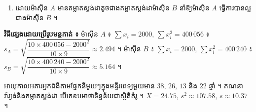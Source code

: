 \begin{example}[លំហាត់គំរូ]
\begin{enumerate}[a]
\[\begin{array}{|c|c|c|}
   & & 56\\ \hline
  \end{array}
  \]
  \[
  \begin{array}{|c|c|c|}\hline
  X_i\,(B) & X_i - \bar{X}_B & (X_i - \bar{X}_B)^2\\ \hline
  192 & -8 & 64\\
  194 & -6 & 36\\
  195 & -5 & 25\\
  198 & -2 & 4\\
  200 & 0 & 0\\
  201 & 1 & 1\\
  203 & 3 & 9\\
  204 & 4 & 16\\
  206 & 6 & 36\\
  207 & 7 & 49\\
  \hline
   & & 240\\ \hline
  \end{array}
  \]
  គម្លាតស្តង់ដាសម្រាប់ម៉ាស៊ីន $A$ ៖ $s_A = \sqrt{\dfrac{\sum(X_i - \bar{X}_A)^2}{n - 1}} = \sqrt{\dfrac{56}{9}} = \sqrt{6.22} \approx 2.49$ ។\\
  គម្លាតស្តង់ដាសម្រាប់ម៉ាស៊ីន $B$ ៖ $s_B = \sqrt{\dfrac{\sum(X_i - \bar{X}_B)^2}{n - 1}} = \sqrt{\dfrac{240}{9}} = \sqrt{26.67} \approx 5.16$ ។
  \item ដោយម៉ាស៊ីន $A$ មានគម្លាតស្តង់ដាតូចជាងគម្លាតស្តង់ដាម៉ាស៊ីន $B$ នាំឱ្យម៉ាស៊ីន $A$ ធ្វើការបានល្អជាងម៉ាស៊ីន $B$ ។
\end{enumerate}
\textbf{វិធីផ្សេងដោយប្រើរូបមន្តកាត់ ៖} ម៉ាស៊ីន $A$ ៖ $\sum x_i = 2000$, $\sum x_i^2 = 400\,056$ ៖ $s_A = \sqrt{\dfrac{10\times 400\,056 - 2000^2}{10\times 9}} \approx 2.494$ ។ ម៉ាស៊ីន $B$ ៖ $\sum x_i = 2000$, $\sum x_i^2 = 400\,240$ ៖ $s_B = \sqrt{\dfrac{10\times 400\,240 - 2000^2}{10\times 9}} \approx 5.164$ ។
\end{example}

\begin{pro}
អាយុកាលអគារអ្នកជំងឺតាមផ្នែកនីមួយៗក្នុងមន្ទីរពេទ្យមួយមាន $38$, $26$, $13$ និង $22$ ឆ្នាំ ។ គណនាវ៉ារ្យង់និងគម្លាតស្តង់ដា បើគេឧបមាថាទិន្នន័យជាស្ថិតិគំរូ ។
\ans
$\bar{X} = 24.75$, $s^2 \approx 107.58$, $s \approx 10.37$ ។
\end{pro}

